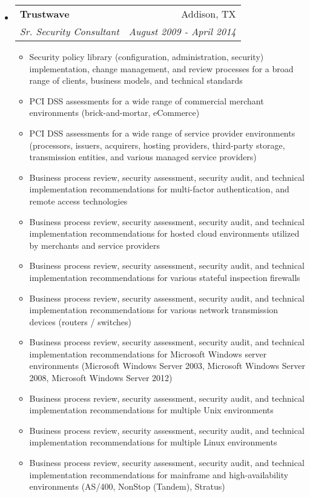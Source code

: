 \documentclass[letterpaper,11pt]{article}
\makeatletter
\newcommand{\resitem}[1]{\item #1 \vspace{-2pt}}
\newcommand{\ressubheading}[4]{
\begin{tabular*}{6.5in}{l@{\cftdotfill{\cftsecdotsep}\extracolsep{\fill}}r}
		\textbf{#1} & #2 \\
		\textit{#3} & \textit{#4} \\
\end{tabular*}\vspace{-6pt}}
\makeatother
\begin{document}
\begin{itemize}
\item
	\ressubheading{Trustwave}{Addison, TX}{Sr. Security Consultant}{August 2009 - April 2014}
	\begin{itemize}
            \resitem{Security policy library (configuration, administration, security) implementation, change management, and review processes for a broad range of clients, business models, and technical standards}
            \resitem{PCI DSS assessments for a wide range of commercial merchant environments (brick-and-mortar, eCommerce)}
            \resitem{PCI DSS assessments for a wide range of service provider environments (processors, issuers, acquirers, hosting providers, third-party storage, transmission entities, and various managed service providers)}
            \resitem{Business process review, security assessment, security audit, and technical implementation recommendations for multi-factor authentication, and remote access technologies}
            \resitem{Business process review, security assessment, security audit, and technical implementation recommendations for hosted cloud environments utilized by merchants and service providers}
            \resitem{Business process review, security assessment, security audit, and technical implementation recommendations for various stateful inspection firewalls}
            \resitem{Business process review, security assessment, security audit, and technical implementation recommendations for various network transmission devices (routers / switches)}
            \resitem{Business process review, security assessment, security audit, and technical implementation recommendations for Microsoft Windows server environments (Microsoft Windows Server 2003, Microsoft Windows Server 2008, Microsoft Windows Server 2012)}
            \resitem{Business process review, security assessment, security audit, and technical implementation recommendations for multiple Unix environments}
            \resitem{Business process review, security assessment, security audit, and technical implementation recommendations for multiple Linux environments}
            \resitem{Business process review, security assessment, security audit, and technical implementation recommendations for mainframe and high-availability environments (AS/400, NonStop (Tandem), Stratus)}
	\end{itemize}


\end{itemize}
\end{document}
